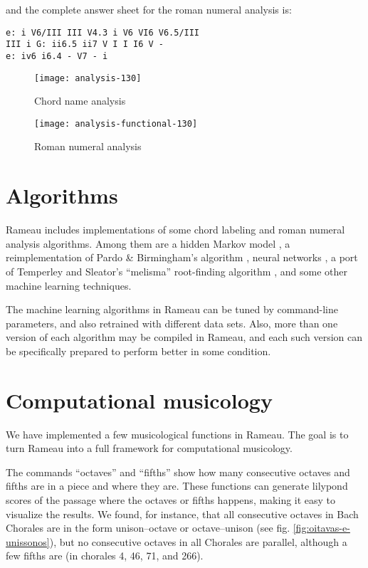 and the complete answer sheet for the roman numeral analysis is:

\begin{verbatim}
e: i V6/III III V4.3 i V6 VI6 V6.5/III
III i G: ii6.5 ii7 V I I I6 V -
e: iv6 i6.4 - V7 - i
\end{verbatim}


\begin{figure}
  \centering
  \texttt{[image: analysis-130]}
  \caption{Chord name analysis}
  \label{fig:chord-name-analysis}
\end{figure}
\begin{figure}
  \centering
  \texttt{[image: analysis-functional-130]}  
  \caption{Roman numeral analysis}
  \label{fig:roman-analysis}
\end{figure}

\section{Algorithms}
\label{sec:algorithms}

Rameau includes implementations of some chord labeling and roman
numeral analysis algorithms. Among them are a hidden Markov model
\cite{raphael.ea03:harmonic}, a reimplementation of Pardo \&
Birmingham's algorithm \cite{pardo.ea99:automated}, neural networks
\cite{tsui02:harmonic}, a port of Temperley and Sleator's ``melisma''
root-finding algorithm \cite{temperley.ea99:modeling}, and some other
machine learning techniques.

The machine learning algorithms in Rameau can be tuned by command-line
parameters, and also retrained with different data sets. Also, more
than one version of each algorithm may be compiled in Rameau, and each
such version can be specifically prepared to perform better in some
condition.

\section{Computational musicology}
\label{sec:comp-music}


We have implemented a few musicological functions in Rameau. The goal
is to turn Rameau into a full framework for computational musicology.

The commands ``octaves'' and ``fifths'' show how many consecutive
octaves and fifths are in a piece and where they are. These functions
can generate lilypond scores of the passage where the octaves or
fifths happens, making it easy to visualize the results. We found, for
instance, that all consecutive octaves in Bach Chorales are in the
form unison--octave or octave--unison (see fig.
\ref{fig:oitavas-e-unissonos}), but no consecutive octaves in all
Chorales are parallel, although a few fifths are (in chorales 4, 46,
71, and 266).


